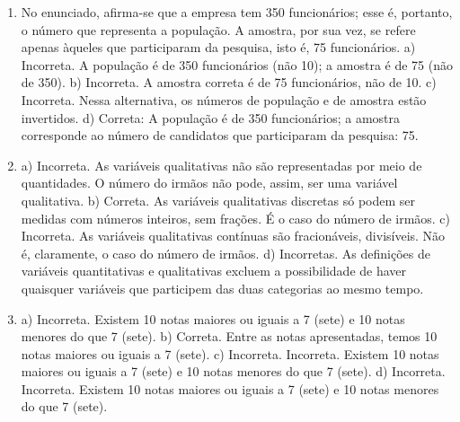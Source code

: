 \begin{enumerate}
\item
No enunciado, afirma-se que a empresa tem 350 funcionários; esse 
é, portanto, o número que representa a população. A amostra, por sua vez, 
se refere apenas àqueles que participaram da pesquisa, isto é, 75
funcionários.
a) Incorreta. A população é de 350 funcionários (não 10); a amostra é de
75 (não de 350).
b) Incorreta. A amostra correta é de 75 funcionários, não de 10.
c) Incorreta. Nessa alternativa, os números de população e de amostra
estão invertidos.
d) Correta: A população é de 350 funcionários; a amostra corresponde ao
número de candidatos que participaram da pesquisa: 75.

\item
a) Incorreta. As variáveis qualitativas não são representadas por 
meio de quantidades. O número do irmãos não pode, assim, ser uma variável 
qualitativa.
b) Correta. As variáveis qualitativas discretas só podem ser medidas
com números inteiros, sem frações. É o caso do número de irmãos. 
c) Incorreta. As variáveis qualitativas contínuas são fracionáveis,
divisíveis. Não é, claramente, o caso do número de irmãos. 
d) Incorretas. As definições de variáveis quantitativas e qualitativas
excluem a possibilidade de haver quaisquer variáveis que participem das
duas categorias ao mesmo tempo.

\item
a) Incorreta. Existem 10 notas maiores ou iguais a 7 (sete) e 10 notas menores do que 7 (sete).
b) Correta. Entre as notas apresentadas, temos 10 notas maiores ou iguais
a 7 (sete).
c) Incorreta. Incorreta. Existem 10 notas maiores ou iguais a 7 (sete) e 10 notas menores do que 7 (sete).
d) Incorreta. Incorreta. Existem 10 notas maiores ou iguais a 7 (sete) e 10 notas menores do que 7 (sete).
\end{enumerate}


